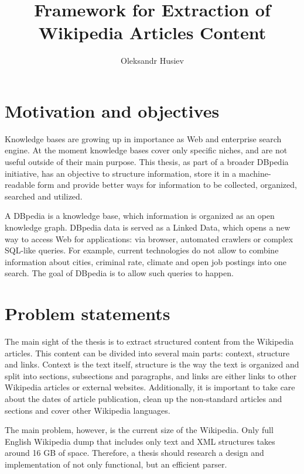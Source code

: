 \documentclass[thesis=M,english]{FITthesis}[2019/12/23]
\title{Framework for Extraction of Wikipedia Articles Content}
\author{Oleksandr Husiev} %
\begin{document}

\begin{introduction}
	
	\section{Motivation and objectives}
	
	Knowledge bases are growing up in importance as Web and enterprise search engine. At the moment knowledge bases cover only specific niches, and are not useful outside of their main purpose. This thesis, as part of a broader DBpedia initiative, has an objective to structure information, store it in a machine-readable form and provide better ways for information to be collected, organized, searched and utilized.
	
	A DBpedia is a knowledge base, which information is organized as an open knowledge graph. DBpedia data is served as a Linked Data, which opens a new way to access Web for applications: via browser, automated crawlers or complex SQL-like queries. For example, current technologies do not allow to combine information about cities, criminal rate, climate and open job postings into one search. The goal of DBpedia is to allow such queries to happen.

	\section{Problem statements}

	The main sight of the thesis is to extract structured content from the Wikipedia articles. This content can be divided into several main parts: context, structure and links. Context is the text itself, structure is the way the text is organized and split into sections, subsections and paragraphs, and links are either links to other Wikipedia articles or external websites. Additionally, it is important to take care about the dates of article publication, clean up the non-standard articles and sections and cover other Wikipedia languages.

	The main problem, however, is the current size of the Wikipedia. Only full English Wikipedia dump that includes only text and XML structures takes around 16 GB of space. Therefore, a thesis should research a design and implementation of not only functional, but an efficient parser.
	
	

\end{introduction}
\end{document}
